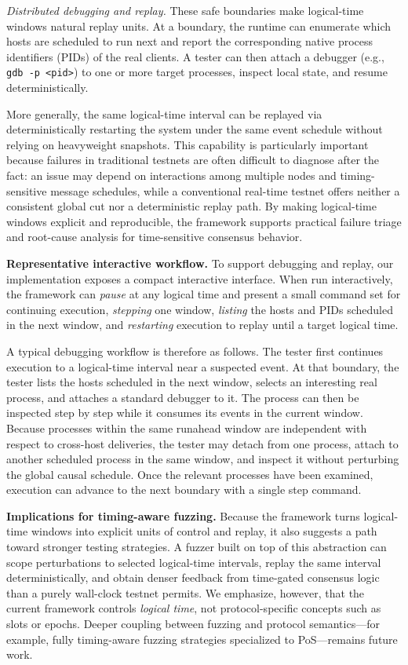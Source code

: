 \smallskip
\noindent\emph{Distributed debugging and replay.}
These safe boundaries make logical-time windows natural replay units. At a boundary, the runtime can enumerate which hosts are scheduled to run next and report the corresponding native process identifiers (PIDs) of the real clients. A tester can then attach a debugger (e.g., \texttt{gdb -p <pid>}) to one or more target processes, inspect local state, and resume deterministically. 

More generally, the same logical-time interval can be replayed via deterministically restarting the system under the same event schedule without relying on heavyweight snapshots.
This capability is particularly important because failures in traditional testnets are often difficult to diagnose after the fact: an issue may depend on interactions among multiple nodes and timing-sensitive message schedules, while a conventional real-time testnet offers neither a consistent global cut nor a deterministic replay path. By making logical-time windows explicit and reproducible, the framework supports practical failure triage and root-cause analysis for time-sensitive consensus behavior.

\smallskip
\noindent\textbf{Representative interactive workflow.}
To support debugging and replay, our implementation exposes a compact interactive interface. When run interactively, the framework can \emph{pause} at any logical time and present a small command set for continuing execution, \emph{stepping} one window, \emph{listing} the hosts and PIDs scheduled in the next window, and \emph{restarting} execution to replay until a target logical time.

A typical debugging workflow is therefore as follows. The tester first continues execution to a logical-time interval near a suspected event. At that boundary, the tester lists the hosts scheduled in the next window, selects an interesting real process, and attaches a standard debugger to it. The process can then be inspected step by step while it consumes its events in the current window. Because processes within the same runahead window are independent with respect to cross-host deliveries, the tester may detach from one process, attach to another scheduled process in the same window, and inspect it without perturbing the global causal schedule. Once the relevant processes have been examined, execution can advance to the next boundary with a single step command.

\smallskip
\noindent\textbf{Implications for timing-aware fuzzing.}
Because the framework turns logical-time windows into explicit units of control and replay, it also suggests a path toward stronger testing strategies. A fuzzer built on top of this abstraction can scope perturbations to selected logical-time intervals, replay the same interval deterministically, and obtain denser feedback from time-gated consensus logic than a purely wall-clock testnet permits. We emphasize, however, that the current framework controls \emph{logical time}, not protocol-specific concepts such as slots or epochs. Deeper coupling between fuzzing and protocol semantics---for example, fully timing-aware fuzzing strategies specialized to PoS---remains future work.
  